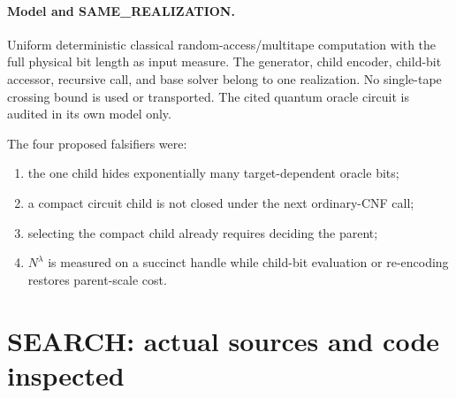 \documentclass[11pt]{article}
\begin{document}
\paragraph{Model and SAME\_REALIZATION.} Uniform deterministic classical
random-access/multitape computation with the full physical bit length as input
measure.  The generator, child encoder, child-bit accessor, recursive call, and
base solver belong to one realization.  No single-tape crossing bound is used or
transported.  The cited quantum oracle circuit is audited in its own model only.

The four proposed falsifiers were:
\begin{enumerate}
\item the one child hides exponentially many target-dependent oracle bits;
\item a compact circuit child is not closed under the next ordinary-CNF call;
\item selecting the compact child already requires deciding the parent;
\item $N^\lambda$ is measured on a succinct handle while child-bit evaluation
      or re-encoding restores parent-scale cost.
\end{enumerate}

\section{SEARCH: actual sources and code inspected}
\end{document}
